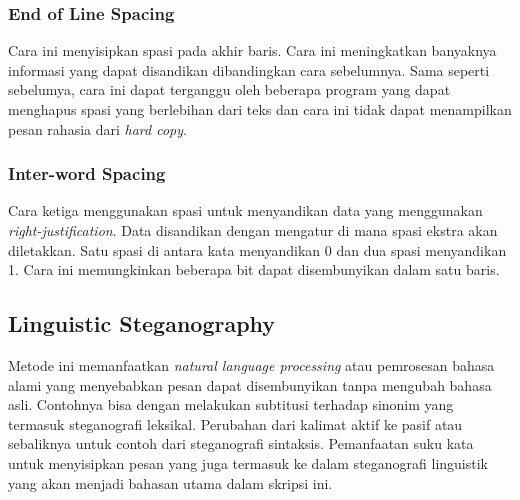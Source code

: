 \subsubsection{End of Line Spacing}

Cara ini menyisipkan spasi pada akhir baris. Cara ini meningkatkan banyaknya informasi yang dapat disandikan dibandingkan cara sebelumnya. Sama seperti sebelumya, cara ini dapat terganggu oleh beberapa program yang dapat menghapus spasi yang berlebihan dari teks dan cara ini tidak dapat menampilkan pesan rahasia dari \textit{hard copy}.

\subsubsection{Inter-word Spacing}

Cara ketiga menggunakan spasi untuk menyandikan data yang menggunakan \textit{right-justification}. Data disandikan dengan mengatur di mana spasi ekstra akan diletakkan. Satu spasi di antara kata menyandikan 0 dan dua spasi menyandikan 1. Cara ini memungkinkan beberapa bit dapat disembunyikan dalam satu baris.

\subsection{Linguistic Steganography}
Metode ini memanfaatkan \textit{natural language processing} atau pemrosesan bahasa alami yang menyebabkan pesan dapat disembunyikan tanpa mengubah bahasa asli. Contohnya bisa dengan melakukan subtitusi terhadap sinonim yang termasuk steganografi leksikal. Perubahan dari kalimat aktif ke pasif atau sebaliknya untuk contoh dari steganografi sintaksis. Pemanfaatan suku kata untuk menyisipkan pesan yang juga termasuk ke dalam steganografi linguistik yang akan menjadi bahasan utama dalam skripsi ini.